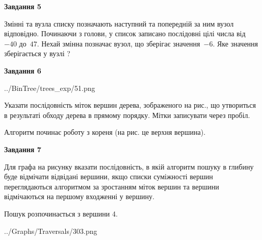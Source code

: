 \documentclass[12pt, ukrainian]{article}
\begin{document}
{\begin {large}
{\begin {center}\textbf{Завдання 5}\end {center}}\par
Змінні  та  вузла списку позначають наступний та попередній за ним вузол відповідно. Починаючи з голови, у список записано послідовні цілі числа від~$-40$ до~$47$. Нехай змінна  позначає вузол, що зберігає значення~$-6$.
Яке значення зберігається у вузлі  ?\par
\newpage

{\begin {center}\textbf{Завдання 6}\end {center}}\par

\begin{center}
	{../BinTree/trees_exp/51.png}
\end{center}
Указати послідовність міток вершин дерева, зображеного на рис., що утвориться в результаті обходу дерева в прямому порядку. Мітки записувати через пробіл.\par Алгоритм починає роботу з кореня (на рис. це верхня вершина).\par
\newpage

{\begin {center}\textbf{Завдання 7}\end {center}}\par
Для графа на рисунку вказати послідовність, в якій алгоритм пошуку в глибину буде відмічати відвідані вершини, якщо списки суміжності вершин переглядаються алгоритмом за зростанням міток вершин та вершини відмічаються на першому вход\-женні у вершину.\par
Пошук розпочинається з вершини 4.\par

\begin{center}
	{../Graphs/Traversals/303.png}
\end{center}\par
\newpage


\end{large}}
\end{document}

